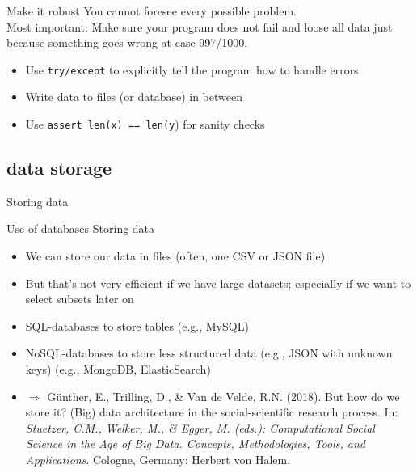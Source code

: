 \documentclass{beamer}
\begin{document}
\begin{frame}{Make it robust}
You cannot foresee every possible problem.\\
Most important: Make sure your program does not fail and loose all data just because something goes wrong at case 997/1000.
	\begin{itemize}
		\item Use \texttt{try/except} to explicitly tell the program how to handle errors
		\item Write data to files (or database) in between
		\item Use \texttt{assert len(x) == len(y}) for sanity checks
	\end{itemize}	
\end{frame}

\subsection{data storage}
\begin{frame}{Storing data}
\begin{block}{Use of databases}
	Storing data
	\begin{itemize}
		\item We can store our data in files (often, one CSV or JSON file)
		\item But that's not very efficient if we have large datasets; especially if we want to select subsets later on
		\item SQL-databases to store tables (e.g., MySQL)
		\item NoSQL-databases to store less structured data (e.g., JSON with unknown keys) (e.g., MongoDB, ElasticSearch)
		\item $\Rightarrow$ \tiny{Günther, E., Trilling, D., \& Van de Velde, R.N. (2018). But how do we store it? (Big) data architecture in the social-scientific research process. In:\textit{ Stuetzer, C.M., Welker, M., \& Egger, M. (eds.): Computational Social Science in the Age of Big Data. Concepts, Methodologies, Tools, and Applications}. Cologne, Germany: Herbert von Halem.}
	\end{itemize}
\end{block}
\end{frame}
\end{document}
